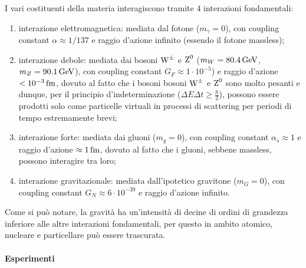 I vari costituenti della materia interagiscono tramite $ 4 $ interazioni fondamentali:
\begin{enumerate}
  \item interazione elettromagnetica: mediata dal fotone ($ m_{\gamma} = 0 $), con coupling constant $ \alpha \approx 1/137 $ e raggio d'azione infinito (essendo il fotone massless);
  \item interazione debole: mediata dai bosoni $ \text{W}^{\pm} $ e $ \text{Z}^0 $ ($ m_W = 80.4\,\text{GeV} $, $ m_Z = 90.1\,\text{GeV} $), con coupling constant $ G_F \approx 1\cdot10^{-5} $) e raggio d'azione $ < 10^{-3}\,\text{fm} $, dovuto al fatto che i bosoni bosoni $ \text{W}^{\pm} $ e $ \text{Z}^0 $ sono molto pesanti e dunque, per il principio d'indeterminazione ($ \Delta E \Delta t \ge \frac{\hbar}{2} $), possono essere prodotti solo come particelle virtuali in processi di scattering per periodi di tempo estremamente brevi;
  \item interazione forte: mediata dai gluoni ($ m_g = 0 $), con coupling constant $ \alpha_s \approx 1 $ e raggio d'azione $ \approx 1\,\text{fm} $, dovuto al fatto che i gluoni, sebbene massless, possono interagire tra loro;
  \item interazione gravitazionale: mediata dall'ipotetico gravitone ($ m_G = 0 $), con coupling constant $ G_N \approx 6\cdot10^{-39} $ e raggio d'azione infinito.
\end{enumerate}
Come si può notare, la gravità ha un'intensità di decine di ordini di grandezza inferiore alle altre interazioni fondamentali, per questo in ambito atomico, nucleare e particellare può essere trascurata.

\paragraph{Esperimenti}

